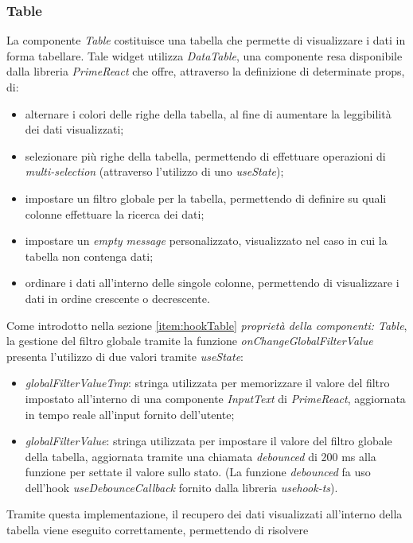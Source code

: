 \subsubsection{Table}
La componente \textit{Table} costituisce una tabella che permette di visualizzare i dati in forma tabellare. \newline
Tale widget utilizza \textit{DataTable}, una componente resa disponibile dalla libreria \textit{PrimeReact} che offre, attraverso
la definizione di determinate props, di:
\begin{itemize}
    \item alternare i colori delle righe della tabella, al fine di aumentare la leggibilità dei dati visualizzati;
    \item selezionare più righe della tabella, permettendo di effettuare operazioni di \textit{multi-selection} (attraverso
          l'utilizzo di uno \textit{useState});
    \item impostare un filtro globale per la tabella, permettendo di definire su quali colonne effettuare la ricerca dei dati;
    \item impostare un \textit{empty message} personalizzato, visualizzato nel caso in cui la tabella non contenga dati;
    \item ordinare i dati all'interno delle singole colonne, permettendo di visualizzare i dati in ordine crescente o decrescente.
\end{itemize}
Come introdotto nella sezione \ref{item:hookTable}{ \textit{proprietà della componenti: Table}}, la gestione del filtro globale tramite
la funzione \textit{onChangeGlobalFilterValue} presenta l'utilizzo di due valori tramite \textit{useState}:
\begin{itemize}
    \item \textit{globalFilterValueTmp}: stringa utilizzata per memorizzare il valore del filtro impostato all'interno di una
          componente \textit{InputText} di \textit{PrimeReact}, aggiornata in tempo reale all'input fornito dell'utente;
    \item \textit{globalFilterValue}: stringa utilizzata per impostare il valore del filtro globale della tabella, aggiornata
          tramite una chiamata \textit{debounced} di 200 ms alla funzione per settate il valore sullo stato. \newline
          (La funzione \textit{debounced} fa uso dell'hook \textit{useDebounceCallback} fornito dalla libreria \textit{usehook-ts}).
\end{itemize}
Tramite questa implementazione, il recupero dei dati visualizzati all'interno della tabella viene eseguito correttamente, permettendo di risolvere
